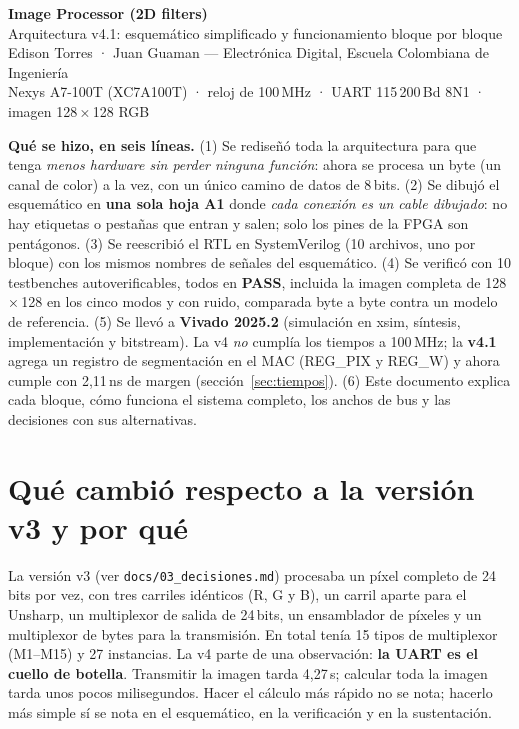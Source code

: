 \documentclass[11pt,a4paper]{article}
\begin{document}
\begin{center}
{\LARGE\bfseries Image Processor (2D filters)}\\[4pt]
{\Large Arquitectura v4.1: esquemático simplificado y funcionamiento bloque por bloque}\\[8pt]
{\normalsize Edison Torres · Juan Guaman — Electrónica Digital, Escuela Colombiana de Ingeniería}\\
{\normalsize Nexys A7-100T (XC7A100T) · reloj de 100\,MHz · UART 115\,200\,Bd 8N1 · imagen 128\,×\,128 RGB}
\end{center}

\begin{idea}
\textbf{Qué se hizo, en seis líneas.}
(1) Se rediseñó toda la arquitectura para que tenga \emph{menos hardware sin perder ninguna función}: ahora se procesa un byte (un canal de color) a la vez, con un único camino de datos de 8\,bits.
(2) Se dibujó el esquemático en \textbf{una sola hoja A1} donde \emph{cada conexión es un cable dibujado}: no hay etiquetas o pestañas que entran y salen; solo los pines de la FPGA son pentágonos.
(3) Se reescribió el RTL en SystemVerilog (10 archivos, uno por bloque) con los mismos nombres de señales del esquemático.
(4) Se verificó con 10 testbenches autoverificables, todos en \textbf{PASS}, incluida la imagen completa de 128\,×\,128 en los cinco modos y con ruido, comparada byte a byte contra un modelo de referencia.
(5) Se llevó a \textbf{Vivado 2025.2} (simulación en xsim, síntesis, implementación y bitstream). La v4 \emph{no} cumplía los tiempos a 100\,MHz; la \textbf{v4.1} agrega un registro de segmentación en el MAC (REG\_PIX y REG\_W) y ahora cumple con 2,11\,ns de margen (sección~\ref{sec:tiempos}).
(6) Este documento explica cada bloque, cómo funciona el sistema completo, los anchos de bus y las decisiones con sus alternativas.
\end{idea}

\tableofcontents
\clearpage

\section{Qué cambió respecto a la versión v3 y por qué}

La versión v3 (ver \texttt{docs/03\_decisiones.md}) procesaba un píxel completo de 24\,bits por vez, con tres carriles idénticos (R, G y B), un carril aparte para el Unsharp, un multiplexor de salida de 24\,bits, un ensamblador de píxeles y un multiplexor de bytes para la transmisión. En total tenía 15 tipos de multiplexor (M1–M15) y 27 instancias. La v4 parte de una observación: \textbf{la UART es el cuello de botella}. Transmitir la imagen tarda 4,27\,s; calcular toda la imagen tarda unos pocos milisegundos. Hacer el cálculo más rápido no se nota; hacerlo más simple sí se nota en el esquemático, en la verificación y en la sustentación.
\end{document}
